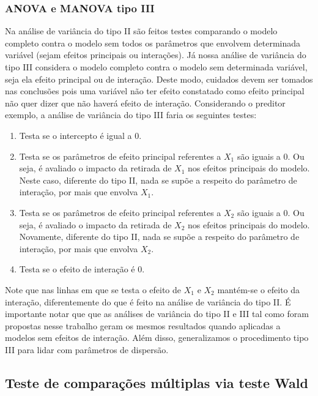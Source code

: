 \documentclass[AMA,STIX1COL]{WileyNJD-v2}
\begin{document}
\subsubsection{ANOVA e MANOVA tipo III}

Na análise de variância do tipo II são feitos testes comparando o modelo completo contra o modelo sem todos os parâmetros que envolvem determinada variável (sejam efeitos principais ou interações). Já nossa análise de variância do tipo III considera o modelo completo contra o modelo sem determinada variável, seja ela efeito principal ou de interação. Deste modo, cuidados devem ser tomados nas conclusões pois uma variável não ter efeito constatado como efeito principal não quer dizer que não haverá efeito de interação. Considerando o preditor exemplo, a análise de variância do tipo III faria os seguintes testes:

\begin{enumerate}
  \item Testa se o intercepto é igual a 0.
  
  \item Testa se os parâmetros de efeito principal referentes a $X_1$ são iguais a 0. Ou seja, é avaliado o impacto da retirada de $X_1$ nos efeitos principais do modelo. Neste caso, diferente do tipo II, nada se supõe a respeito do parâmetro de interação, por mais que envolva $X_1$.
  
  \item Testa se os parâmetros de efeito principal referentes a $X_2$ são iguais a 0. Ou seja, é avaliado o impacto da retirada de $X_2$ nos efeitos principais do modelo. Novamente, diferente do tipo II, nada se supõe a respeito do parâmetro de interação, por mais que envolva $X_2$.
  
  \item Testa se o efeito de interação é 0.
\end{enumerate}

Note que nas linhas em que se testa o efeito de $X_1$ e $X_2$ mantém-se o efeito da interação, diferentemente do que é feito na análise de variância do tipo II. É importante notar que que as análises de variância do tipo II e III tal como foram propostas nesse trabalho geram os mesmos resultados quando aplicadas a modelos sem efeitos de interação. Além disso, generalizamos o procedimento tipo III para lidar com parâmetros de dispersão.

\subsection{Teste de comparações múltiplas via teste Wald}
\end{document}
